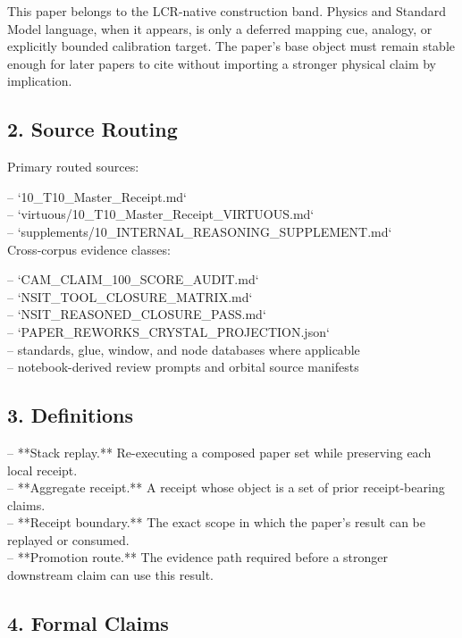 \documentclass[11pt]{article}
\begin{document}
This paper belongs to the LCR-native construction band. Physics and Standard Model language, when it appears, is only a deferred mapping cue, analogy, or explicitly bounded calibration target. The paper's base object must remain stable enough for later papers to cite without importing a stronger physical claim by implication.

\subsection*{2. Source Routing}

Primary routed sources:

\noindent{}-- `10\_T10\_Master\_Receipt.md`\\
\noindent{}-- `virtuous/10\_T10\_Master\_Receipt\_VIRTUOUS.md`\\
\noindent{}-- `supplements/10\_INTERNAL\_REASONING\_SUPPLEMENT.md`\\

Cross-corpus evidence classes:

\noindent{}-- `CAM\_CLAIM\_100\_SCORE\_AUDIT.md`\\
\noindent{}-- `NSIT\_TOOL\_CLOSURE\_MATRIX.md`\\
\noindent{}-- `NSIT\_REASONED\_CLOSURE\_PASS.md`\\
\noindent{}-- `PAPER\_REWORKS\_CRYSTAL\_PROJECTION.json`\\
\noindent{}-- standards, glue, window, and node databases where applicable\\
\noindent{}-- notebook-derived review prompts and orbital source manifests\\

\subsection*{3. Definitions}

\noindent{}-- **Stack replay.** Re-executing a composed paper set while preserving each local receipt.\\
\noindent{}-- **Aggregate receipt.** A receipt whose object is a set of prior receipt-bearing claims.\\
\noindent{}-- **Receipt boundary.** The exact scope in which the paper's result can be replayed or consumed.\\
\noindent{}-- **Promotion route.** The evidence path required before a stronger downstream claim can use this result.\\

\subsection*{4. Formal Claims}
\end{document}
